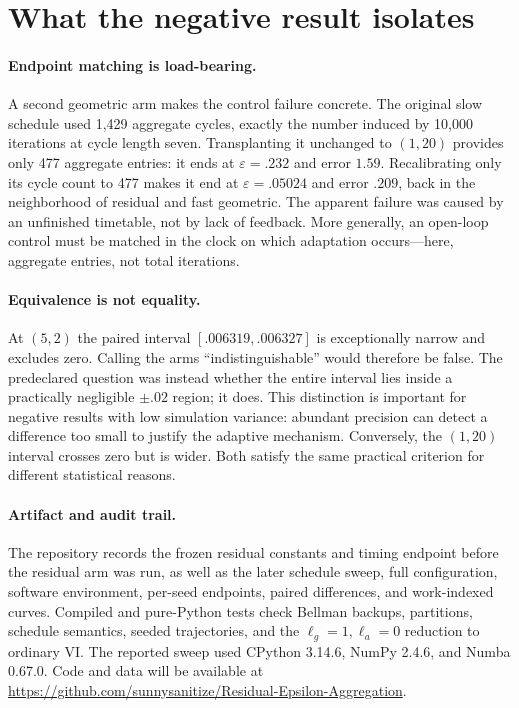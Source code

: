 \documentclass{article}
\newcommand{\VI}{\textsc{VI}}
\begin{document}
\section{What the negative result isolates}

\paragraph{Endpoint matching is load-bearing.}
A second geometric arm makes the control failure concrete.  The original slow
schedule used 1,429 aggregate cycles, exactly the number induced by 10,000
iterations at cycle length seven.  Transplanting it unchanged to $(1,20)$
provides only 477 aggregate entries: it ends at $\varepsilon=.232$ and error
$1.59$.  Recalibrating only its cycle count to 477 makes it end at
$\varepsilon=.05024$ and error $.209$, back in the neighborhood of residual
and fast geometric.  The apparent failure was caused by an unfinished
timetable, not by lack of feedback.  More generally, an open-loop control must
be matched in the clock on which adaptation occurs---here, aggregate entries,
not total iterations.

\paragraph{Equivalence is not equality.}
At $(5,2)$ the paired interval $[.006319,.006327]$ is exceptionally narrow and
excludes zero.  Calling the arms ``indistinguishable'' would therefore be
false.  The predeclared question was instead whether the entire interval lies
inside a practically negligible $\pm.02$ region; it does.  This distinction is
important for negative results with low simulation variance: abundant precision
can detect a difference too small to justify the adaptive mechanism.  Conversely,
the $(1,20)$ interval crosses zero but is wider.  Both satisfy the same practical
criterion for different statistical reasons.

\paragraph{Artifact and audit trail.}
The repository records the frozen residual constants and timing endpoint before
the residual arm was run, as well as the later schedule sweep, full configuration,
software environment, per-seed endpoints, paired differences, and work-indexed
curves.  Compiled and pure-Python tests check Bellman backups, partitions,
schedule semantics, seeded trajectories, and the $\ell_g=1,\ell_a=0$ reduction
to ordinary \VI{}.  The reported sweep used CPython 3.14.6, NumPy 2.4.6, and
Numba 0.67.0.  Code and data will be available at
\url{https://github.com/sunnysanitize/Residual-Epsilon-Aggregation}.
\end{document}
